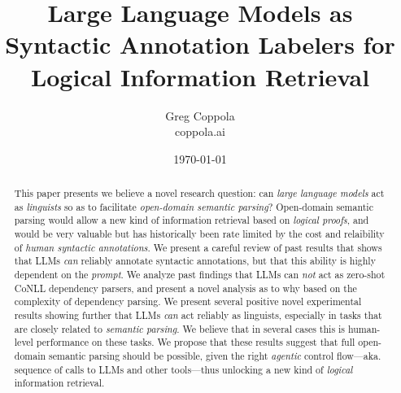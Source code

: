 \documentclass[11pt]{article}
\title{Large Language Models as Syntactic Annotation Labelers for Logical Information Retrieval}
\author{Greg Coppola\\coppola.ai}
\date{\today}
\begin{document}
\maketitle

\begin{abstract}
    This paper presents we believe a novel research question: can {\em large language models} act as {\em linguists} so as to facilitate {\em open-domain semantic parsing}?
    Open-domain semantic parsing would allow a new kind of information retrieval based on {\em logical proofs}, and would be very valuable but has historically been rate limited by the cost and relaibility of {\em human syntactic annotations}.
    We present a careful review of past results that shows that LLMs {\em can} reliably annotate syntactic annotations, but that this ability is highly dependent on the {\em prompt}.
    We analyze past findings that LLMs can {\em not} act as zero-shot CoNLL dependency parsers, and present a novel analysis as to why based on the complexity of dependency parsing.
    We present several positive novel experimental results showing further that LLMs {\em can} act reliably as linguists, especially in tasks that are closely related to {\em semantic parsing}.
    We believe that in several cases this is human-level performance on these tasks.
    We propose that these results suggest that full open-domain semantic parsing should be possible, given the right {\em agentic} control flow---aka. sequence of calls to LLMs and other tools---thus unlocking a new kind of {\em logical} information retrieval.
\end{abstract}
\end{document}
